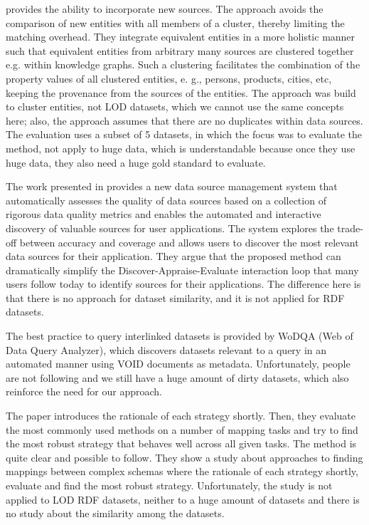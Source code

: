 \documentclass[sw]{iosart2x}
\begin{document}
\cite{nentwig2018incremental} provides the ability to incorporate new sources.
The approach avoids the comparison of new entities with all members of a cluster, thereby limiting the matching overhead.
They integrate equivalent entities in a more holistic manner such that equivalent entities from arbitrary many sources are clustered together e.g. within knowledge graphs.
Such a clustering facilitates the combination of the property values of all clustered entities, e. g., persons, products, cities, etc, keeping the provenance from the sources of the entities. The approach was build to cluster entities, not LOD datasets, which we cannot use the same concepts here; also, the approach assumes that there are no duplicates within data sources.
The evaluation uses a subset of 5 datasets, in which the focus was to evaluate the method, not apply to huge data, which is understandable because once they use huge data, they also need a huge gold standard to evaluate.

The work presented in\cite{rekatsinas2015finding} provides a new data source management system that automatically assesses the quality of data sources based on a collection of rigorous data quality metrics and enables the automated and interactive discovery of valuable sources for user applications.
The system explores the trade-off between accuracy and coverage and allows users to discover the most relevant data sources for their application.
They argue that the proposed method can dramatically simplify the Discover-Appraise-Evaluate interaction loop that many users follow today to identify sources for their applications.
The difference here is that there is no approach for dataset similarity, and it is not applied for RDF datasets.

The best practice to query interlinked datasets is provided by WoDQA (Web of Data Query Analyzer)\cite{akar2012querying}, which discovers datasets relevant to a query in an automated manner using VOID documents as metadata.
Unfortunately, people are not following and we still have a huge amount of dirty datasets, which also reinforce the need for our approach.

The paper\cite{peukert2010comparing} introduces the rationale of each strategy shortly.
Then, they evaluate the most commonly used methods on a number of mapping tasks and try to find the most robust strategy that behaves well across all given tasks.
The method is quite clear and possible to follow.
They show a study about approaches to finding mappings between complex schemas where the rationale of each strategy shortly, evaluate and find the most robust strategy.
Unfortunately, the study is not applied to LOD RDF datasets, neither to a huge amount of datasets and there is no study about the similarity among the datasets.
\end{document}
